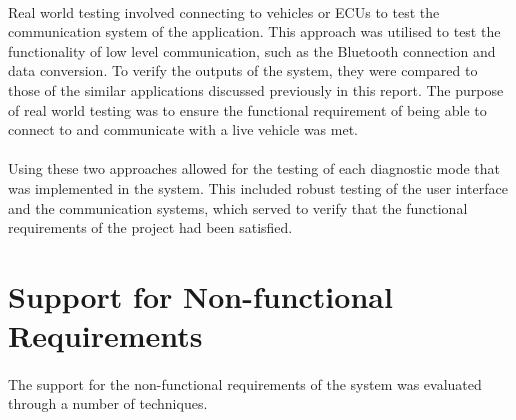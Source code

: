 	\paragraph{}{
	Real world testing involved connecting to vehicles or ECUs to test the communication system of the application. This approach was utilised to test the functionality of low level communication, such as the Bluetooth connection and data conversion. To verify the outputs of the system, they were compared to those of the similar applications discussed previously in this report. The purpose of real world testing was to ensure the functional requirement of being able to connect to and communicate with a live vehicle was met.
	}
	
	\paragraph{}{
	Using these two approaches allowed for the testing of each diagnostic mode that was implemented in the system. This included robust testing of the user interface and the communication systems, which served to verify that the functional requirements of the project had been satisfied. 
	}
	
	
		
\section{Support for Non-functional Requirements}	
	\paragraph{}{
	The support for the non-functional requirements of the system was evaluated through a number of techniques.
	}
